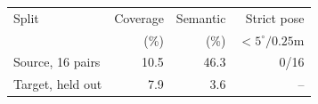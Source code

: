 \begin{tabular}{lrrr}
\toprule
Split & Coverage & Semantic & Strict pose \\
 & (\%) & (\%) & $<5^\circ/0.25$m \\
\midrule
Source, 16 pairs & 10.5 & 46.3 & 0/16 \\
Target, held out & 7.9 & 3.6 & -- \\
\bottomrule
\end{tabular}
